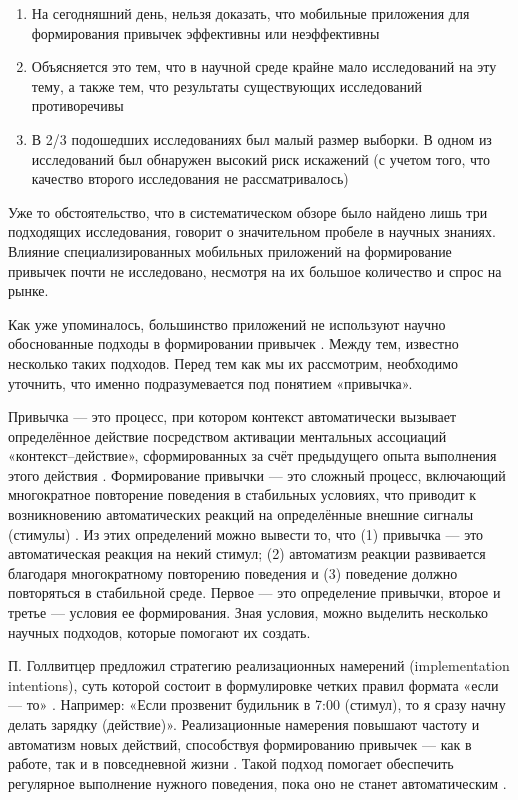 \documentclass[pdflatex,sn-mathphys-num]{sn-jnl}%
\theoremstyle{thmstyleone}%
\theoremstyle{thmstyletwo}%
\theoremstyle{thmstylethree}%
\begin{document}
\begin{enumerate}
    \item На сегодняшний день, нельзя доказать, что мобильные приложения для формирования привычек эффективны или неэффективны
    \item Объясняется это тем, что в научной среде крайне мало исследований на эту тему, а также тем, что результаты существующих исследований противоречивы
    \item В 2/3 подошедших исследованиях был малый размер выборки. В одном из исследований был обнаружен высокий риск искажений (с учетом того, что качество второго исследования не рассматривалось)
\end{enumerate}

Уже то обстоятельство, что в систематическом обзоре было найдено лишь три подходящих исследования, говорит о значительном пробеле в научных знаниях. Влияние специализированных мобильных приложений на формирование привычек почти не исследовано, несмотря на их большое количество и спрос на рынке.

Как уже упоминалось, большинство приложений не используют научно обоснованные подходы в формировании привычек \cite{stawarz_beyond_2015}. Между тем, известно несколько таких подходов. Перед тем как мы их рассмотрим, необходимо уточнить, что именно подразумевается под понятием «привычка».

Привычка — это процесс, при котором контекст автоматически вызывает определённое действие посредством активации ментальных ассоциаций «контекст–действие», сформированных за счёт предыдущего опыта выполнения этого действия \cite{gardner_habit_2019}. Формирование привычки — это сложный процесс, включающий многократное повторение поведения в стабильных условиях, что приводит к возникновению автоматических реакций на определённые внешние сигналы (стимулы) \cite{Lally01052013}. Из этих определений можно вывести то, что (1) привычка — это автоматическая реакция на некий стимул; (2) автоматизм реакции развивается благодаря многократному повторению поведения и (3) поведение должно повторяться в стабильной среде. Первое — это определение привычки, второе и третье — условия ее формирования. Зная условия, можно выделить несколько научных подходов, которые помогают их создать.

П. Голлвитцер предложил стратегию реализационных намерений (implementation intentions), суть которой состоит в формулировке четких правил формата «если — то» \cite{gollwitzer_implementation_1999}. Например: «Если прозвенит будильник в 7:00 (стимул), то я сразу начну делать зарядку (действие)». Реализационные намерения повышают частоту и автоматизм новых действий, способствуя формированию привычек — как в работе, так и в повседневной жизни \cite{Trenz2024Promoting, Holland2006Breaking, Wicaksono2019Using, VanTimmeren2022Instant, ADRIAANSE2011183, lally_2008, tam_2010}. Такой подход помогает обеспечить регулярное выполнение нужного поведения, пока оно не станет автоматическим \cite{Trenz2024Promoting, Holland2006Breaking, Wicaksono2019Using}. 
\end{document}
